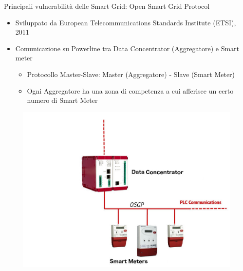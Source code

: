 \begin{frame}{Principali vulnerabilità delle Smart Grid: Open Smart Grid Protocol}
	\begin{itemize}[<+- | alert@+>]
		\item Sviluppato da European Telecommunications Standards Institute (ETSI), 2011
		\item Comunicazione su Powerline tra Data Concentrator (Aggregatore) e Smart meter
		\begin{itemize} 
			\item Protocollo Master-Slave: Master (Aggregatore) - Slave (Smart Meter)
			\item Ogni Aggregatore ha una zona di competenza a cui afferisce un certo numero di Smart Meter
		\end{itemize}
	\end{itemize}
	\begin{figure}[h] 
		\includegraphics[scale=0.15,cfbox=blue_slides 1pt 0pt]{imgs/aggregator.jpg}
	\end{figure}
\end{frame}


